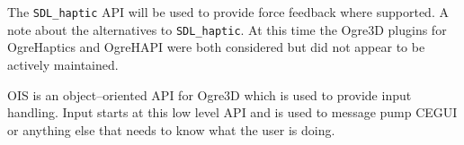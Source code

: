 

\startitemize[4]

The {\tt SDL_haptic} API will be used to provide force feedback where supported. A note about the alternatives to {\tt SDL_haptic}. At this time the Ogre3D plugins for OgreHaptics and OgreHAPI were both considered but did not appear to be actively maintained.


OIS is an object--oriented API for Ogre3D which is used to provide input handling. Input starts at this low level API and is used to message pump CEGUI or anything else that needs to know what the user is doing.
\stopitemize

